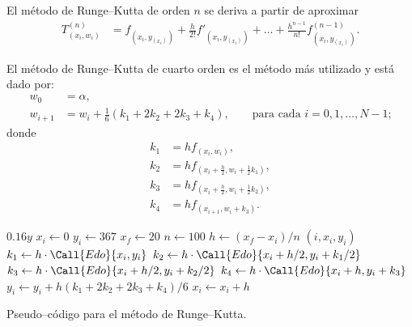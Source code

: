 \documentclass[english,spanish,Ce-table,Ce-theorem]{CabesHW}
\begin{document}

El método de Runge--Kutta de orden $n$ se deriva a partir de aproximar
\begin{align*}
    T^{(n)}_{(x_i, w_i)} &= f_{(x_i, y_{(x_i)})} + \frac{h}{2!}f'_{(x_i, y_{(x_i)})} + \ldots + \frac{h^{n-1}}{n!}f^{(n-1)}_{(x_i, y_{(x_i)})}. 
\end{align*}


El método de Runge--Kutta de cuarto orden es el método más utilizado y está dado por:
\begin{align*}
    w_0 &= \alpha,\\
    w_{i+1} &= w_i + \frac{1}{6}(k_1 + 2k_2 + 2k_3 + k_4), \qquad \text{para cada $i= 0, 1, \ldots, N-1$;}
\end{align*}
donde
\begin{align*}
    k_1 &= hf_{(x_i, w_i)},\\
    k_2 &= hf_{(x_i + \frac{h}{2}, w_i + \frac{1}{2}k_1)},\\
    k_3 &= hf_{(x_i + \frac{h}{2}, w_i + \frac{1}{2}k_2)},\\
    k_4 &= hf_{(x_{i+1}, w_i + k_3)}.
\end{align*}

\begin{algorithm}[H]
    \centering
    \begin{myalg}[1]
        \State \Output $0.16 y$
    \EndFunction
    \State \phantom{}
    \State $x_i \gets 0$ 
    \State $y_i \gets 367$ 
    \State $x_f \gets 20$ 
    \State $n \gets 100$ 
    \State \phantom{}
    \State $h \gets (x_f - x_i)/n$ 
        \State \Output $(i, x_i, y_i)$
        \State \phantom{}
        \State $k_1 \gets h\cdot\Call{Edo}{x_i, y_i}$
        \State $k_2 \gets h\cdot\Call{Edo}{x_i+h/2, y_i+k_1/2}$
        \State $k_3 \gets h\cdot\Call{Edo}{x_i+h/2, y_i+k_2/2}$
        \State $k_4 \gets h\cdot\Call{Edo}{x_i+h, y_i+k_3}$
        \State \phantom{}
        \State $y_i \gets y_i + h(k_1 + 2k_2 + 2k_3 + k_4)/6$
        \State $x_i \gets x_i + h$
    \EndFor
    \end{myalg}
    \caption{Pseudo--código para el método de Runge--Kutta.}
    \label{alg:runge-kutta}
\end{algorithm}
\end{document}
